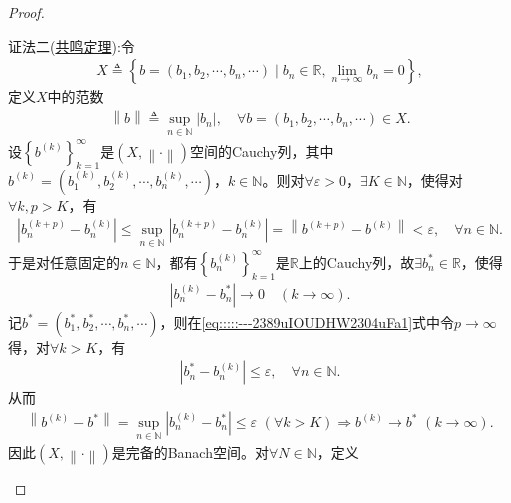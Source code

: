 \documentclass[../../main.tex]{subfiles}%
\begin{document}
\begin{proof}
\begin{enumerate}[(1)]
{\color{blue}证法二(\hyperref[Functional-Analysis-theorem:泛函分析--共鸣定理]{共鸣定理}):}令
\begin{align*}
X\triangleq \left\{ b=\left( b_1,b_2,\cdots ,b_n,\cdots \right) \mid b_n\in \mathbb{R} ,\lim\limits_{n\rightarrow \infty}b_n=0 \right\},
\end{align*}
定义$X$中的范数
\begin{align*}
\left\| b \right\| \triangleq \sup\limits_{n\in \mathbb{N}}\left| b_n \right|,\quad \forall b=\left( b_1,b_2,\cdots ,b_n,\cdots \right) \in X.
\end{align*}
设$\left\{ b^{\left( k \right)} \right\}_{k=1}^{\infty}$是$\left( X,\left\| \cdot \right\| \right)$空间的Cauchy列，其中$b^{\left( k \right)}=\left( b_{1}^{\left( k \right)},b_{2}^{\left( k \right)},\cdots ,b_{n}^{\left( k \right)},\cdots \right)$，$k\in \mathbb{N}$。则对$\forall \varepsilon >0$，$\exists K\in \mathbb{N}$，使得对$\forall k,p>K$，有
\begin{align}
\left| b_{n}^{\left( k+p \right)}-b_{n}^{\left( k \right)} \right|\leqslant \sup\limits_{n\in \mathbb{N}}\left| b_{n}^{\left( k+p \right)}-b_{n}^{\left( k \right)} \right|=\left\| b^{\left( k+p \right)}-b^{\left( k \right)} \right\| <\varepsilon ,\quad \forall n\in \mathbb{N}.
\label{eq:::::---2389uIOUDHW2304uFa1}
\end{align}
于是对任意固定的$n\in \mathbb{N}$，都有$\left\{ b_{n}^{\left( k \right)} \right\}_{k=1}^{\infty}$是$\mathbb{R}$上的Cauchy列，故$\exists b_{n}^{*}\in \mathbb{R}$，使得
\begin{align*}
\left| b_{n}^{\left( k \right)}-b_{n}^{*} \right|\rightarrow 0\quad \left( k\rightarrow \infty \right).
\end{align*}
记$b^*=\left( b_{1}^{*},b_{2}^{*},\cdots ,b_{n}^{*},\cdots \right)$，则在\eqref{eq:::::---2389uIOUDHW2304uFa1}式中令$p\rightarrow \infty$得，对$\forall k>K$，有
\begin{align*}
\left| b_{n}^{*}-b_{n}^{\left( k \right)} \right|\leqslant \varepsilon ,\quad \forall n\in \mathbb{N}.
\end{align*}
从而
\begin{align*}
\left\| b^{\left( k \right)}-b^* \right\| =\sup\limits_{n\in \mathbb{N}}\left| b_{n}^{\left( k \right)}-b_{n}^{*} \right|\leqslant \varepsilon \,\,\left( \forall k>K \right) \Longrightarrow b^{\left( k \right)}\rightarrow b^*\,\,\left( k\rightarrow \infty \right).
\end{align*}
因此$\left( X,\left\| \cdot \right\| \right)$是完备的Banach空间。对$\forall N\in \mathbb{N}$，定义

\end{enumerate}
\end{proof}
\end{document}

